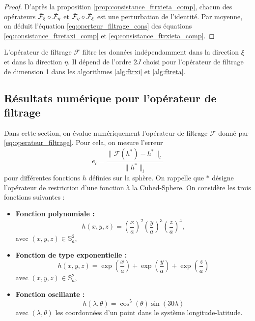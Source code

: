 \begin{proof}
D'après la proposition \ref{prop:consistance_ftrxieta_comp}, chacun des opérateurs $\tilde{\mathcal{F}}_{\xi} \circ \tilde{\mathcal{F}}_{\eta}$ et $\tilde{\mathcal{F}}_{\eta} \circ \tilde{\mathcal{F}}_{\xi}$ est une perturbation de l'identité.
Par moyenne, on déduit l'équation \eqref{eq:operteur_filtrage_cons} des équations \eqref{eq:consistance_ftretaxi_comp} et \eqref{eq:consistance_ftrxieta_comp}.
\end{proof}

L'opérateur de filtrage $\mathcal{F}$ filtre les données indépendamment dans la direction $\xi$ et dans la direction $\eta$. Il dépend de l'ordre $2J$ choisi pour l'opérateur de filtrage de dimension 1 dans les algorithmes \ref{alg:ftrxi} et \ref{alg:ftreta}.














\subsection{Résultats numérique pour l'opérateur de filtrage}

Dans cette section, on évalue numériquement l'opérateur de filtrage $\mathcal{F}$ donné par \eqref{eq:operateur_filtrage}. Pour cela, on mesure l'erreur
\begin{equation}
e_l = \dfrac{\| \mathcal{F}(h^*) - h^* \|_l}{\| h^* \|_l}
\end{equation}
pour différentes fonctions $h$ définies sur la sphère. On rappelle que $*$ désigne l'opérateur de restriction d'une fonction à la Cubed-Sphere. On considère les trois fonctions suivantes :

\begin{itemize}
\item \textbf{Fonction polynomiale :} 
\begin{equation}
h(x,y,z)=\left( \dfrac{x}{a} \right)^2  \left( \dfrac{y}{a} \right)^3 \left( \dfrac{z}{a} \right)^4,
\label{eq:fct_test1}
\end{equation}
avec $(x,y,z) \in \mathbb{S}_a^2$,

\item \textbf{Fonction de type exponentielle :}
\begin{equation}
h(x,y,z)=\exp \left( \dfrac{x}{a} \right) + \exp \left( \dfrac{y}{a} \right) + \exp \left( \dfrac{z}{a} \right)
\label{eq:fct_test2}
\end{equation}
avec $(x,y,z) \in \mathbb{S}_a^2$,

\item \textbf{Fonction oscillante :}
\begin{equation}
h(\lambda, \theta)= \cos^5 (\theta) \sin ( 30 \lambda)
\label{eq:fct_test3}
\end{equation}
avec $(\lambda, \theta)$ les coordonnées d'un point dans le système longitude-latitude.
\end{itemize}


